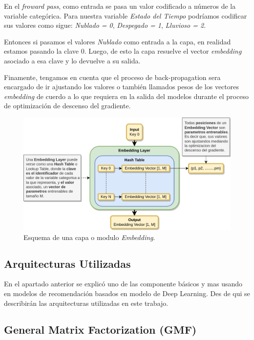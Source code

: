 \documentclass[11pt,a4paper,twoside]{thesis}
\begin{document}
En el \textit{froward pass}, como entrada se pasa un valor codificado a números de la variable categórica. Para nuestra variable \textit{Estado del Tiempo} podríamos codificar sus valores como sigue: \textit{Nublado = 0}, \textit{Despegado = 1}, \textit{Lluvioso = 2}.

Entonces si pasamos el valores \textit{Nublado} como entrada a la capa, en realidad estamos pasando la clave 0. Luego, de esto la capa resuelve el vector \textit{embedding} asociado a esa clave y lo devuelve a su salida.

Finamente, tengamos en cuenta que el proceso de back-propagation sera encargado de ir ajustando los valores o también llamados pesos de los vectores \textit{embedding} de cuerdo a lo que requiera en la salida del modelos durante el proceso de optimización de descenso del gradiente. 

\begin{figure}[ht!]
	\centering
	\includegraphics[width=13cm]{./images/Embedding-Layer.png}
	\caption{Esquema de una capa o modulo \textit{Embedding}.}
	\label{fig:embeddingLayer}
\end{figure}


\clearpage

\subsection{Arquitecturas Utilizadas}

En el apartado anterior se explicó uno de las componente básicos y mas usando en modelos de recomendación basados en modelo de Deep Learning. Des de qui se describirán las arquitecturas utilizadas en este trabajo.

\subsection{General Matrix Factorization (GMF)}
\end{document}
